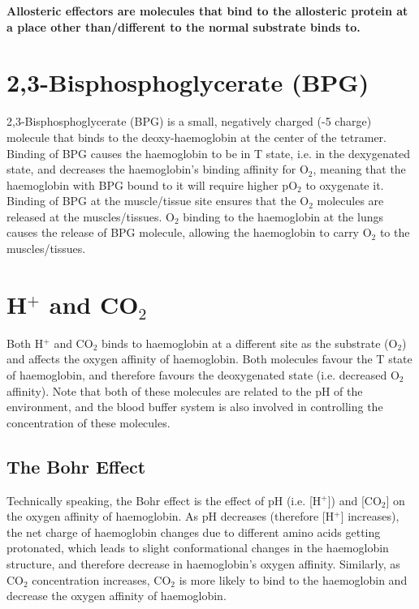 \documentclass[a4paper, 12pt]{report}
\begin{document}
\begin{center}
\textbf{Allosteric effectors are molecules that bind to the allosteric protein at a place other than/different to the normal substrate binds to.}
\end{center}

\section{2,3-Bisphosphoglycerate (BPG)}

2,3-Bisphosphoglycerate (BPG) is a small, negatively charged (-5 charge) molecule that binds to the deoxy-haemoglobin at the center of the tetramer.
Binding of BPG causes the haemoglobin to be in T state, i.e. in the dexygenated state, and decreases the haemoglobin's binding affinity for O$_2$, meaning that the haemoglobin with BPG bound to it will require higher pO$_2$ to oxygenate it.
Binding of BPG at the muscle/tissue site ensures that the O$_2$ molecules are released at the muscles/tissues.
O$_2$ binding to the haemoglobin at the lungs causes the release of BPG molecule, allowing the haemoglobin to carry O$_2$ to the muscles/tissues.

\section{H$^+$ and CO$_2$}

Both H$^+$ and CO$_2$ binds to haemoglobin at a different site as the substrate (O$_2$) and affects the oxygen affinity of haemoglobin.
Both molecules favour the T state of haemoglobin, and therefore favours the deoxygenated state (i.e. decreased O$_2$ affinity).
Note that both of these molecules are related to the pH of the environment, and the blood buffer system is also involved in controlling the concentration of these molecules.

\subsection{The Bohr Effect}

Technically speaking, the Bohr effect is the effect of pH (i.e. [H$^+$]) and [CO$_2$] on the oxygen affinity of haemoglobin.
As pH decreases (therefore [H$^+$] increases), the net charge of haemoglobin changes due to different amino acids getting protonated, which leads to slight conformational changes in the haemoglobin structure, and therefore decrease in haemoglobin's oxygen affinity.
Similarly, as CO$_2$ concentration increases, CO$_2$ is more likely to bind to the haemoglobin and decrease the oxygen affinity of haemoglobin.
\end{document}
